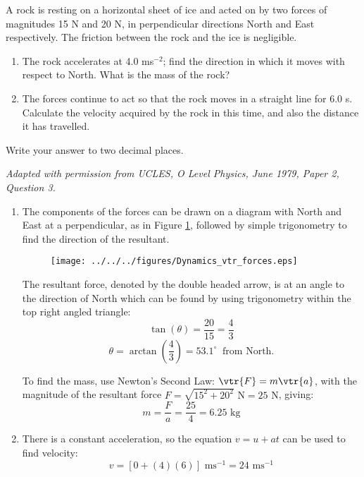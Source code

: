 
\begin{problem}[O1979PIIQ3a]
{A rock is resting on a horizontal sheet of ice and acted on by two forces of magnitudes 15 N and 20 N, in perpendicular directions North and East respectively. The friction between the rock and the ice is negligible.
\begin{enumerate}
	\item The rock accelerates at 4.0 ms$^{-2}$; find the direction in which it moves with respect to North. What is the mass of the rock?   
	\item The forces continue to act so that the rock moves in a straight line for 6.0 s. Calculate the velocity acquired by the rock in this time, and also the distance it has travelled.   
\end{enumerate}
Write your answer to two decimal places.}
{\textit{Adapted with permission from UCLES, O Level Physics, June 1979, Paper 2, Question 3.}}
{\begin{enumerate}
	\item The components of the forces can be drawn on a diagram with North and East at a perpendicular, as in Figure \ref{fig:Dynamics_vtr_forces}, followed by simple trigonometry to find the direction of the resultant. 
\begin{figure}[h]
	\centering
	\texttt{[image: ../../../figures/Dynamics\_vtr\_forces.eps]}
	\caption{}
	\label{fig:Dynamics_vtr_forces}
\end{figure}

The resultant force, denoted by the double headed arrow, is at an angle to the direction of North which can be found by using trigonometry within the top right angled triangle:
	\begin{equation*}\tan(\theta)=\frac{20}{15} = \frac{4}{3} \end{equation*}
	\begin{equation*}\theta = \arctan\left(\frac{4}{3}\right) = 53.1^{\circ} \:\textrm{ from North.}\end{equation*}

To find the mass, use Newton's Second Law: $\vtr{F} = m\vtr{a}$, with the magnitude of the resultant force $F = \sqrt{15^{2} + 20^{2}} \textrm{ N} = 25 \textrm{ N}$, giving: 
\begin{equation*}m = \frac{F}{a} = \frac{25}{4} = 6.25 \textrm{ kg} \end{equation*}
	\item There is a constant acceleration, so the equation $v = u + at$ can be used to find velocity: 
	\begin{equation*} v = [0 + (4)(6)] \textrm{ ms}^{-1} = 24 \textrm{ ms}^{-1} \end{equation*}


\end{enumerate}}
\end{problem}
